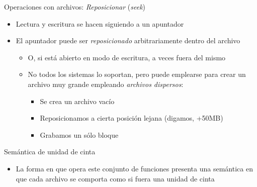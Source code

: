 \documentclass[presentation]{beamer}
\newcommand{\rarrow}{$\rightarrow$\hskip 0.5em}
\begin{document}
\begin{frame}[label={sec:org6e3c933}]{Operaciones con archivos: \emph{Reposicionar} (\emph{seek})}
\begin{itemize}
\item Lectura y escritura se hacen siguiendo a un apuntador
\item El apuntador puede ser \emph{reposicionado} arbitrariamente dentro del
archivo
\begin{itemize}
\item O, si está abierto en modo de escritura, a veces fuera del mismo
\item No todos los sistemas lo soportan, pero puede emplearse para
crear un archivo muy grande empleando \emph{archivos dispersos}:
\begin{itemize}
\item Se crea un archivo vacío
\item Reposicionamos a cierta posición lejana (digamos, +50MB)
\item Grabamos un sólo bloque
\end{itemize}
\end{itemize}
\end{itemize}
\end{frame}

\begin{frame}[label={sec:orgc1b5b0b}]{Semántica de unidad de cinta}
\begin{itemize}
\item La forma en que opera este conjunto de funciones presenta una
semántica en que cada archivo se comporta como si fuera una unidad
de cinta
\end{itemize}
\end{frame}
\end{document}
